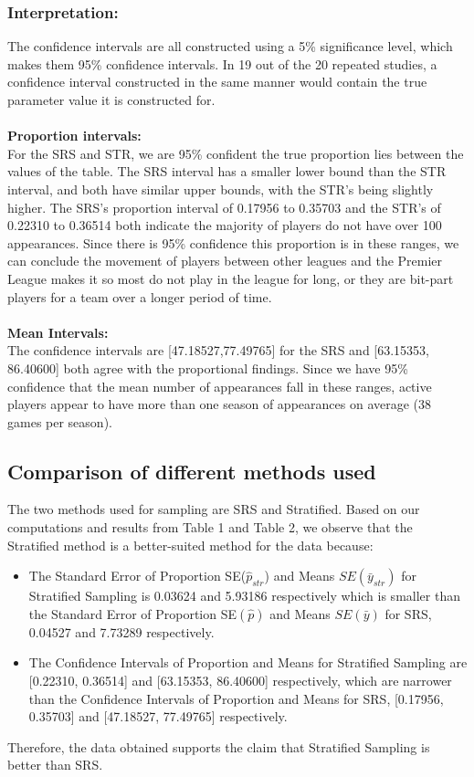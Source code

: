 \documentclass[paper=a4, fontsize=12pt,twoside]{article}	%
\begin{document}
\subsubsection{Interpretation:}
The confidence intervals are all constructed using a 5\% significance level, which makes them 95\% confidence intervals.  In 19 out of the 20 repeated studies, a confidence interval constructed in the same manner would contain the true parameter value it is constructed for.\\\\
\textbf{Proportion intervals:}\\
For the SRS and STR, we are 95\% confident the true proportion lies between the values of the table.  The SRS interval has a smaller lower bound than the STR interval, and both have similar upper bounds, with the STR's being slightly higher.  The SRS's proportion interval of 0.17956 to 0.35703 and the STR's of 0.22310 to 0.36514 both indicate the majority of players do not have over 100 appearances.  Since there is 95\% confidence this proportion is in these ranges, we can conclude the movement of players between other leagues and the Premier League makes it so most do not play in the league for long, or they are bit-part players for a team over a longer period of time.\\\\
\textbf{Mean Intervals:}\\
The confidence intervals are [47.18527,77.49765] for the SRS and [63.15353, 86.40600] both agree with the proportional findings.  Since we have 95\% confidence that the mean number of appearances fall in these ranges, active players appear to have more than one season of appearances on average (38 games per season). 

\subsection{Comparison of different methods used}
The two methods used for sampling are SRS and Stratified. Based on our computations and results from Table 1 and Table 2, we observe that the Stratified method is a better-suited method for the data because:
\begin{itemize}
\item The Standard Error of Proportion SE($\hat{p}_{str}$) and Means $SE(\bar{y}_{str})$ for Stratified Sampling is 0.03624 and 5.93186 respectively which is smaller than the Standard Error of Proportion SE$(\hat{p})$ and Means $SE(\bar{y})$ for SRS, 0.04527 and 7.73289 respectively.
\item The Confidence Intervals of Proportion and Means for Stratified Sampling are [0.22310, 0.36514] and [63.15353, 86.40600] respectively, which are narrower than the Confidence Intervals of Proportion and Means for SRS,  [0.17956, 0.35703] and [47.18527, 77.49765] respectively.

\end{itemize}
Therefore, the data obtained supports the claim that Stratified Sampling is better than SRS.
\end{document}

